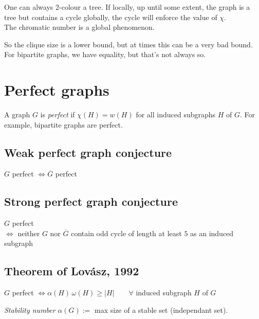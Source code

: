 		One can always 2-colour a tree. If locally, up until some extent, the graph is a tree but contains a cycle globally, the cycle will enforce the value of $\chi$.\\
		
		The chromatic number is a global phenomenon.
		
	So the clique size is a lower bound, but at times this can be a very bad bound. For bipartite graphs, we have equality, but that's not always so.
	
	\section{Perfect graphs}
		A graph $G$ is \textit{perfect} if $\chi(H) = w(H)$ for all induced subgraphs $H$ of $G$. For example, bipartite graphs are perfect.


\subsection{Weak perfect graph conjecture}
$G$ perfect $\iff \overline{G}$ perfect

\subsection{Strong perfect graph conjecture}
$G$ perfect\\
$\iff$ neither $G$ nor $\overline{G}$ contain odd cycle of length at least $5$
as an induced subgraph

\subsection{Theorem of Lovász, 1992}
$G$ perfect
$\iff \alpha(H)\,\omega(H) \geq |H|
\qquad\forall$ induced subgraph $H$ of $G$

\bigskip
\textit{Stability number}
$\alpha(G) :=$ max size of a stable set (independant set).

